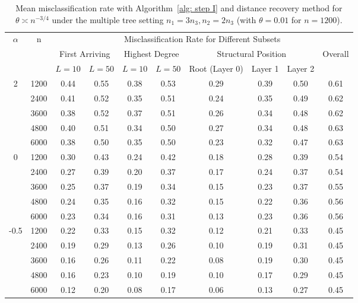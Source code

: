 \documentclass[twoside,11pt]{article}
\theoremstyle{remark}
\begin{document}
\begin{table}[tbp]
\setlength{\tabcolsep}{3.5pt}

\centering

{
\begin{tabular}{c|c|cc|cc|ccc|c}
\hline
\hline
\multirow{3}{*}{$\alpha$} & \multirow{3}{*}{n}
& \multicolumn{8}{c}{Misclassification Rate for Different Subsets} \\
\cline{3-10}
& 
& \multicolumn{2}{c|}{First Arriving}
& \multicolumn{2}{c|}{Highest Degree}
& \multicolumn{3}{c|}{Structural Position}
& \multirow{2}{*}{Overall} \\
\cline{3-9}
& 
& $L=10$ & $L=50$
& $L=10$ & $L=50$
& Root (Layer 0) & Layer 1 & Layer 2
& \\
\hline
\multirow{5}{*}{2}
& 1200 & 0.44 & 0.55 & 0.38 & 0.53 & 0.29 & 0.39 & 0.50 & 0.61 \\
& 2400 & 0.41 & 0.52 & 0.35 & 0.51 & 0.24 & 0.35 & 0.49 & 0.62 \\
& 3600 & 0.38 & 0.52 & 0.37 & 0.51 & 0.26 & 0.34 & 0.48 & 0.62 \\
& 4800 & 0.40 & 0.51 & 0.34 & 0.50 & 0.27 & 0.34 & 0.48 & 0.63 \\
& 6000 & 0.38 & 0.50 & 0.35 & 0.50 & 0.23 & 0.32 & 0.47 & 0.63 \\
\hline
\multirow{5}{*}{0}
& 1200 & 0.30 & 0.43 & 0.24 & 0.42 & 0.18 & 0.28 & 0.39 & 0.54 \\
& 2400 & 0.27 & 0.39 & 0.20 & 0.37 & 0.17 & 0.24 & 0.37 & 0.54 \\
& 3600 & 0.25 & 0.37 & 0.19 & 0.34 & 0.15 & 0.23 & 0.37 & 0.55 \\
& 4800 & 0.24 & 0.35 & 0.16 & 0.32 & 0.15 & 0.22 & 0.36 & 0.56 \\
& 6000 & 0.23 & 0.34 & 0.16 & 0.31 & 0.13 & 0.23 & 0.36 & 0.56 \\
\hline
\multirow{5}{*}{-0.5}
& 1200 & 0.22 & 0.33 & 0.15 & 0.32 & 0.12 & 0.21 & 0.33 & 0.45 \\
& 2400 & 0.19 & 0.29 & 0.13 & 0.26 & 0.10 & 0.19 & 0.31 & 0.45 \\
& 3600 & 0.16 & 0.26 & 0.11 & 0.22 & 0.08 & 0.19 & 0.30 & 0.45 \\
& 4800 & 0.16 & 0.23 & 0.10 & 0.19 & 0.10 & 0.17 & 0.29 & 0.45 \\
& 6000 & 0.12 & 0.20 & 0.08 & 0.17 & 0.06 & 0.13 & 0.27 & 0.45 \\
\hline
\hline
\end{tabular}
}


\caption{Mean misclassification rate with Algorithm~\ref{alg: step I} and distance recovery method for $\theta \asymp n^{-3/4}$ under the multiple tree setting $n_1 = 3 n_3, n_2=2 n_3$ (with $\theta=0.01$ for $n=1200$).}
\label{tab:mean_error_scale_n34 3}
\end{table}
\end{document}
